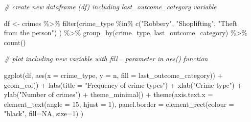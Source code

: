 \documentclass[
]{book}
\newenvironment{Shaded}{\begin{snugshade}}{\end{snugshade}}
\newcommand{\AttributeTok}[1]{\textcolor[rgb]{0.77,0.63,0.00}{#1}}
\newcommand{\CommentTok}[1]{\textcolor[rgb]{0.56,0.35,0.01}{\textit{#1}}}
\newcommand{\ConstantTok}[1]{\textcolor[rgb]{0.00,0.00,0.00}{#1}}
\newcommand{\DecValTok}[1]{\textcolor[rgb]{0.00,0.00,0.81}{#1}}
\newcommand{\FunctionTok}[1]{\textcolor[rgb]{0.00,0.00,0.00}{#1}}
\newcommand{\NormalTok}[1]{#1}
\newcommand{\OtherTok}[1]{\textcolor[rgb]{0.56,0.35,0.01}{#1}}
\newcommand{\SpecialCharTok}[1]{\textcolor[rgb]{0.00,0.00,0.00}{#1}}
\newcommand{\StringTok}[1]{\textcolor[rgb]{0.31,0.60,0.02}{#1}}
\begin{document}
\begin{Shaded}
\begin{Highlighting}[]
\CommentTok{\# create new dataframe (df) including last\_outcome\_category variable}

\NormalTok{df }\OtherTok{\textless{}{-}}\NormalTok{ crimes }\SpecialCharTok{\%\textgreater{}\%} 
  \FunctionTok{filter}\NormalTok{(crime\_type }\SpecialCharTok{\%in\%} \FunctionTok{c}\NormalTok{(}\StringTok{"Robbery"}\NormalTok{, }
                           \StringTok{"Shoplifting"}\NormalTok{, }
                           \StringTok{"Theft from the person"}\NormalTok{)}
\NormalTok{         ) }\SpecialCharTok{\%\textgreater{}\%} 
  \FunctionTok{group\_by}\NormalTok{(crime\_type, last\_outcome\_category) }\SpecialCharTok{\%\textgreater{}\%} 
  \FunctionTok{count}\NormalTok{() }
  


\CommentTok{\# plot including new variable with fill= parameter in aes() function}

\FunctionTok{ggplot}\NormalTok{(df, }\FunctionTok{aes}\NormalTok{(}\AttributeTok{x =}\NormalTok{ crime\_type, }\AttributeTok{y =}\NormalTok{ n, }\AttributeTok{fill =}\NormalTok{ last\_outcome\_category)) }\SpecialCharTok{+} 
  \FunctionTok{geom\_col}\NormalTok{() }\SpecialCharTok{+} 
  \FunctionTok{labs}\NormalTok{(}\AttributeTok{title =} \StringTok{"Frequency of crime types"}\NormalTok{) }\SpecialCharTok{+} 
  \FunctionTok{xlab}\NormalTok{(}\StringTok{"Crime type"}\NormalTok{) }\SpecialCharTok{+} 
  \FunctionTok{ylab}\NormalTok{(}\StringTok{"Number of crimes"}\NormalTok{) }\SpecialCharTok{+} 
  \FunctionTok{theme\_minimal}\NormalTok{() }\SpecialCharTok{+} 
  \FunctionTok{theme}\NormalTok{(}\AttributeTok{axis.text.x =} \FunctionTok{element\_text}\NormalTok{(}\AttributeTok{angle =} \DecValTok{15}\NormalTok{, }
                                   \AttributeTok{hjust =} \DecValTok{1}\NormalTok{), }
        \AttributeTok{panel.border =} \FunctionTok{element\_rect}\NormalTok{(}\AttributeTok{colour =} \StringTok{"black"}\NormalTok{, }
                                    \AttributeTok{fill=}\ConstantTok{NA}\NormalTok{, }
                                    \AttributeTok{size=}\DecValTok{1}\NormalTok{)}
\NormalTok{        )}
\end{Highlighting}
\end{Shaded}
\end{document}
